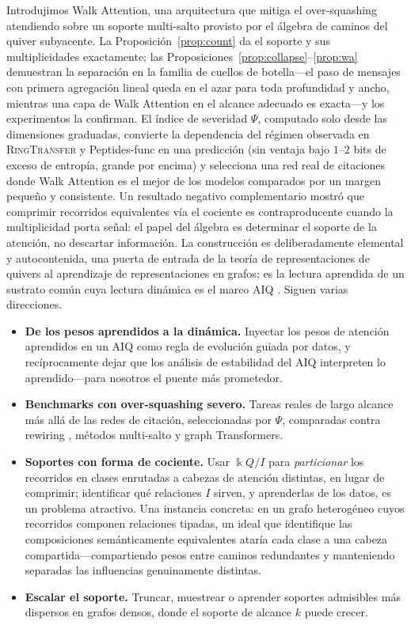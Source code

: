 \documentclass[runningheads]{llncs}
\newcommand{\kk}{\Bbbk}
\newcommand{\kQ}{\kk Q}
\begin{document}
Introdujimos Walk Attention, una arquitectura que mitiga el over-squashing
atendiendo sobre un soporte multi-salto provisto por el álgebra de caminos del
quiver subyacente. La Proposición~\ref{prop:count} da el soporte y sus
multiplicidades exactamente; las
Proposiciones~\ref{prop:collapse}--\ref{prop:wa} demuestran la separación en la
familia de cuellos de botella---el paso de mensajes con primera agregación
lineal queda en el azar para toda profundidad y ancho, mientras una capa de
Walk Attention en el alcance adecuado es exacta---y los experimentos la
confirman. El índice de severidad $\Psi$, computado solo desde las dimensiones
graduadas, convierte la dependencia del régimen observada en
\textsc{RingTransfer} y Peptides-func en una predicción (sin ventaja bajo
$1$--$2$ bits de exceso de entropía, grande por encima) y selecciona una red
real de citaciones donde Walk Attention es el mejor de los modelos comparados
por un margen pequeño y consistente. Un resultado negativo complementario
mostró que comprimir
recorridos equivalentes vía el cociente es contraproducente cuando la
multiplicidad porta señal: el papel del álgebra es determinar el soporte de la
atención, no descartar información. La construcción es deliberadamente
elemental y autocontenida, una puerta de entrada de la teoría de
representaciones de quivers al aprendizaje de representaciones en grafos; es la
lectura aprendida de un sustrato común cuya lectura dinámica es el marco AIQ
\cite{zainea2026aiq}. Siguen varias direcciones.

\begin{itemize}
  \item \textbf{De los pesos aprendidos a la dinámica.} Inyectar los pesos de
  atención aprendidos en un AIQ como regla de evolución guiada por datos, y
  recíprocamente dejar que los análisis de estabilidad del AIQ interpreten lo
  aprendido---para nosotros el puente más prometedor.
  \item \textbf{Benchmarks con over-squashing severo.} Tareas reales de largo
  alcance más allá de las redes de citación, seleccionadas por $\Psi$,
  comparadas contra rewiring
  \cite{topping2022understanding}, métodos multi-salto \cite{gutteridge2023drew}
  y graph Transformers.
  \item \textbf{Soportes con forma de cociente.} Usar $\kQ/I$ para
  \emph{particionar} los recorridos en clases enrutadas a cabezas de atención
  distintas, en lugar de comprimir; identificar qué relaciones $I$ sirven, y
  aprenderlas de los datos, es un problema atractivo. Una instancia concreta:
  en un grafo heterogéneo cuyos recorridos componen relaciones tipadas, un
  ideal que identifique las composiciones semánticamente equivalentes ataría
  cada clase a una cabeza compartida---compartiendo pesos entre caminos
  redundantes y manteniendo separadas las influencias genuinamente distintas.
  \item \textbf{Escalar el soporte.} Truncar, muestrear o aprender soportes
  admisibles más dispersos en grafos densos, donde el soporte de alcance $k$
  puede crecer.
\end{itemize}
\end{document}
